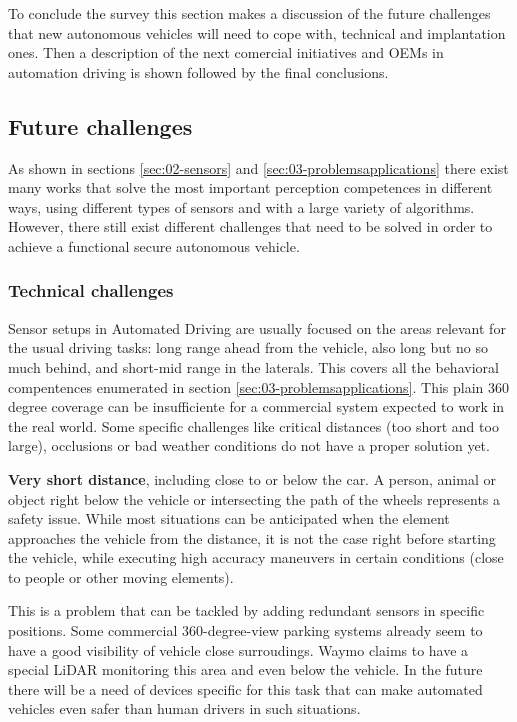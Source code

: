 
To conclude the survey this section makes a discussion of the future challenges that new autonomous vehicles will need to cope with, technical and implantation ones. Then a description of the next comercial initiatives and OEMs in automation driving is shown followed by the final conclusions.



\subsection{Future challenges}

As shown in sections \ref{sec:02-sensors} and \ref{sec:03-problemsapplications} there exist many works that solve the most important perception competences in different ways, using different types of sensors and with a large variety of algorithms. However, there still exist different challenges that need to be solved in order to achieve a functional secure autonomous vehicle. 

\subsubsection{Technical challenges}

Sensor setups in Automated Driving are usually focused on the areas relevant 
for the usual driving tasks: long range ahead from the vehicle, also long but 
no so much behind, and short-mid range in the laterals. This covers all the 
behavioral compentences enumerated in section 
\ref{sec:03-problemsapplications}. 
This plain 360 degree coverage can be insufficiente for a commercial system
expected to work in the real world. Some specific challenges like 
critical distances (too short and too large), occlusions or bad weather 
conditions do not have a proper solution yet.

\textbf{Very short distance}, including close to or below the car.
    A person, animal or object right below the vehicle or intersecting 
    the path of the wheels represents a safety issue. While most situations
    can be anticipated when the element approaches the vehicle from the
    distance, it is not the case right before starting the vehicle, 
    while executing high accuracy maneuvers in certain conditions 
    (close to people or other moving elements).  
    
    This is a problem that can be tackled by adding redundant sensors in 
    specific positions. Some commercial 360-degree-view parking systems 
    \cite{gandhi2006vehicle} already seem to have a good visibility of vehicle 
    close 
    surroudings. Waymo claims to have a special LiDAR monitoring this area
    and even below the vehicle.         
    In the future there will be a need of devices specific for this task 
    that can make automated vehicles even safer than human drivers in such 
    situations.
      
